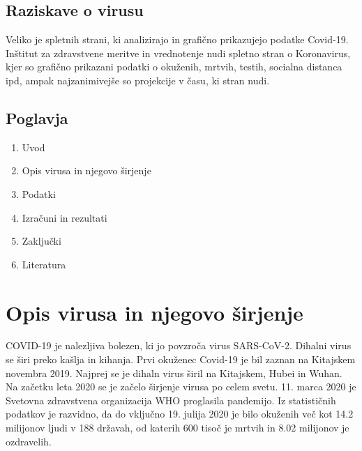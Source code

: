 \documentclass[a4paper,11pt]{article}
\begin{document}
\subsection{Raziskave o virusu}
Veliko je spletnih strani, ki analizirajo in grafično prikazujejo podatke Covid-19. Inštitut za zdravstvene meritve in vrednotenje nudi spletno stran o Koronavirus, kjer so grafično prikazani podatki o okuženih, mrtvih, testih, socialna distanca ipd, ampak najzanimivejše so projekcije v času, ki stran nudi.

\subsection{Poglavja}
\begin{enumerate}
\item{Uvod}
\item{Opis virusa in njegovo širjenje}
\item{Podatki}
\item{Izračuni in rezultati}
\item{Zaključki}
\item{Literatura}
\end{enumerate}

\section{Opis virusa in njegovo širjenje}
COVID-19 je nalezljiva bolezen, ki jo povzroča virus SARS-CoV-2. Dihalni virus se širi preko kašlja in kihanja. Prvi okuženec Covid-19 je bil zaznan na Kitajskem novembra 2019. Najprej se je dihaln virus širil na Kitajskem, Hubei in Wuhan. Na začetku leta 2020 se je začelo širjenje virusa po celem svetu. 11. marca 2020 je Svetovna zdravstvena organizacija WHO proglasila pandemijo. Iz statističnih podatkov je razvidno, da do vključno 19. julija 2020 je bilo okuženih več kot 14.2 milijonov ljudi v 188 državah, od katerih 600 tisoč je mrtvih in 8.02 milijonov je ozdravelih.
\end{document}
